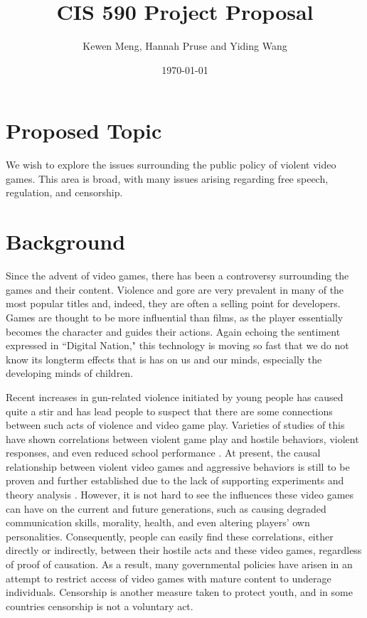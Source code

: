 \documentclass[12pt]{article}
\title{CIS 590 Project Proposal}
\author{Kewen Meng, Hannah Pruse and Yiding Wang}
\date{\today}
\begin{document}
\maketitle
\vspace{-10mm}
\section*{Proposed Topic}
We wish to explore the issues surrounding the public policy of violent video games. This area is broad, with many issues arising regarding free speech, regulation, and censorship. 

\section*{Background}
\indent\indent Since the advent of video games, there has been a controversy surrounding the games and their content. Violence and gore are very prevalent in many of the most popular titles and, indeed, they are often a selling point for developers. Games are thought to be more influential than films, as the player essentially becomes the character and guides their actions. Again echoing the sentiment expressed in ``Digital Nation," this technology is moving so fast that we do not know its longterm effects that is has on us and our minds, especially the developing minds of children.

Recent increases in gun-related violence initiated by young people has caused quite a stir and has lead people to suspect that there are some connections between such acts of violence and video game play. Varieties of studies of this have shown correlations between violent game play and hostile behaviors, violent responses, and even reduced school performance \cite{barlett2009, gentile2004, anderson2003}. At present, the causal relationship between violent video games and aggressive behaviors is still to be proven and further established due to the lack of supporting experiments and theory analysis \cite{ferguson2013}. However, it is not hard to see the influences these video games can have on the current and future generations, such as causing degraded communication skills, morality, health, and even altering players' own personalities. Consequently, people can easily find these correlations, either directly or indirectly, between their hostile acts and these video games, regardless of proof of causation. As a result, many governmental policies have arisen in an attempt to restrict access of video games with mature content to underage individuals. Censorship is another measure taken to protect youth, and in some countries censorship is not a voluntary act.
\end{document}
